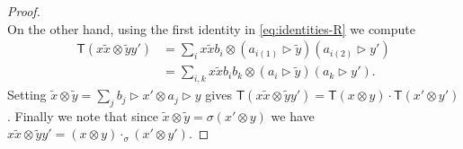 \documentclass[10pt,a4paper]{amsart}
\newcommand{\tmap}{\mathsf{T}}
\begin{document}
\begin{proof}
\[\]
On the other hand, using the first identity in \eqref{eq:identities-R} we compute
\[
\begin{split}
\tmap(x \tilde{x} \otimes \tilde{y} y')
& = \sum_i x \tilde{x} b_i \otimes (a_{i (1)} \triangleright \tilde{y}) (a_{i (2)} \triangleright y') \\
& = \sum_{i, k} x \tilde{x} b_i b_k \otimes (a_i \triangleright \tilde{y}) (a_k \triangleright y').
\end{split}
\]
Setting $\tilde{x} \otimes \tilde{y} = \sum_j b_j \triangleright x' \otimes a_j \triangleright y$ gives $\tmap(x \tilde{x} \otimes \tilde{y} y') = \tmap(x \otimes y) \cdot \tmap(x' \otimes y')$.
Finally we note that since $\tilde{x} \otimes \tilde{y} = \sigma(x' \otimes y)$ we have $x \tilde{x} \otimes \tilde{y} y' = (x \otimes y) \cdot_\sigma (x' \otimes y')$.
\end{proof}
\end{document}
